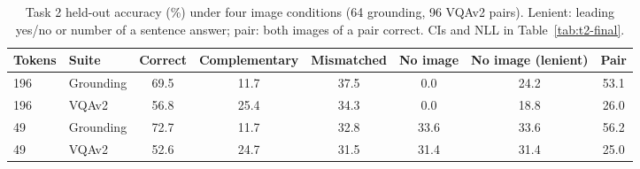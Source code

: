 \begin{table}[t]
\centering
\small
\caption{Task 2 held-out accuracy (\%) under four image conditions (64 grounding, 96 VQAv2 pairs). Lenient: leading yes/no or number of a sentence answer; pair: both images of a pair correct. CIs and NLL in Table~\ref{tab:t2-final}.}
\label{tab:t2-main}
\begin{adjustbox}{max width=\linewidth}
\begin{tabular}{llcccccc}
\toprule
Tokens & Suite & Correct & Complementary & Mismatched & No image & No image (lenient) & Pair \\
\midrule
196 & Grounding & 69.5 & 11.7 & 37.5 & 0.0 & 24.2 & 53.1 \\
196 & VQAv2 & 56.8 & 25.4 & 34.3 & 0.0 & 18.8 & 26.0 \\
\midrule
49 & Grounding & 72.7 & 11.7 & 32.8 & 33.6 & 33.6 & 56.2 \\
49 & VQAv2 & 52.6 & 24.7 & 31.5 & 31.4 & 31.4 & 25.0 \\
\bottomrule
\end{tabular}
\end{adjustbox}
\end{table}
